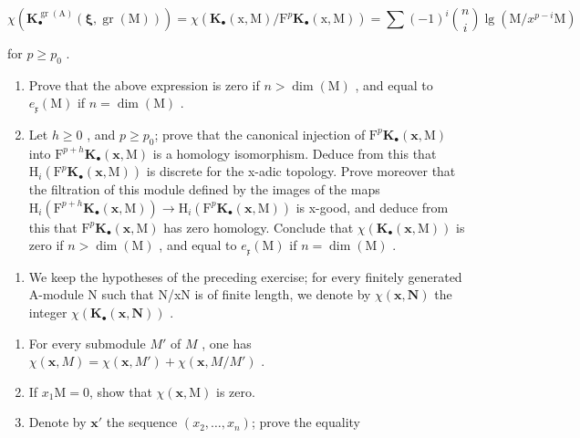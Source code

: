 \[
\chi \left(\mathbf {K} _ {\bullet} ^ {\operatorname{gr} (\mathrm{A})} (\boldsymbol {\xi}, \operatorname{gr} (\mathrm{M}))\right) = \chi \left(\mathbf {K} _ {\bullet} (\mathrm{x}, \mathrm{M}) / \mathrm{F} ^ {p} \mathbf {K} _ {\bullet} (\mathrm{x}, \mathrm{M})\right) = \sum (- 1) ^ {i} \binom {n} {i} \lg (\mathrm{M} / x ^ {p - i} \mathrm{M})
\]

for \(p \geqslant p_0\) .

\begin{enumerate}
\def\labelenumi{\alph{enumi})}
\setcounter{enumi}{2}
\item
  Prove that the above expression is zero if \(n > \dim(\mathrm{M})\) , and equal to \(e_{\mathfrak{x}}(\mathrm{M})\) if \(n = \dim(\mathrm{M})\) .
\item
  Let \(h \geqslant 0\) , and \(p \geqslant p_{0}\); prove that the canonical injection of \(\mathrm{F}^{p}\mathbf{K}_{\bullet}(\mathbf{x},\mathrm{M})\) into \(\mathrm{F}^{p+h}\mathbf{K}_{\bullet}(\mathbf{x},\mathrm{M})\) is a homology isomorphism. Deduce from this that \(\mathrm{H}_{i}(\mathrm{F}^{p}\mathbf{K}_{\bullet}(\mathbf{x},\mathrm{M}))\) is discrete for the x-adic topology. Prove moreover that the filtration of this module defined by the images of the maps \(\mathrm{H}_{i}(\mathrm{F}^{p+h}\mathbf{K}_{\bullet}(\mathbf{x},\mathrm{M})) \to \mathrm{H}_{i}(\mathrm{F}^{p}\mathbf{K}_{\bullet}(\mathbf{x},\mathrm{M}))\) is x-good, and deduce from this that \(\mathrm{F}^{p}\mathbf{K}_{\bullet}(\mathbf{x},\mathrm{M})\) has zero homology. Conclude that \(\chi(\mathbf{K}_{\bullet}(\mathbf{x},\mathrm{M}))\) is zero if \(n > \dim(\mathrm{M})\) , and equal to \(e_{\mathfrak{x}}(\mathrm{M})\) if \(n = \dim(\mathrm{M})\) .
\end{enumerate}

\begin{enumerate}
\def\labelenumi{\arabic{enumi})}
\setcounter{enumi}{5}
\tightlist
\item
  We keep the hypotheses of the preceding exercise; for every finitely generated A-module N such that N/xN is of finite length, we denote by \(\chi(\mathbf{x},\mathbf{N})\) the integer \(\chi(\mathbf{K}_{\bullet}(\mathbf{x},\mathbf{N}))\) .
\end{enumerate}

\begin{enumerate}
\def\labelenumi{\alph{enumi})}
\item
  For every submodule \(M'\) of \(M\) , one has \(\chi(\mathbf{x}, M) = \chi(\mathbf{x}, M') + \chi(\mathbf{x}, M/M')\) .
\item
  If \(x_{1}\mathrm{M} = 0\), show that \(\chi (\mathbf{x},\mathrm{M})\) is zero.
\item
  Denote by \(\mathbf{x}'\) the sequence \((x_2,\ldots ,x_n)\); prove the equality
\end{enumerate}


